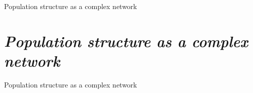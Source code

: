
                 {Population structure as a complex network}
\chapter{\textit{Population structure as a complex network}}
\label{cap:popstruc}
                 {Population structure as a complex network}






